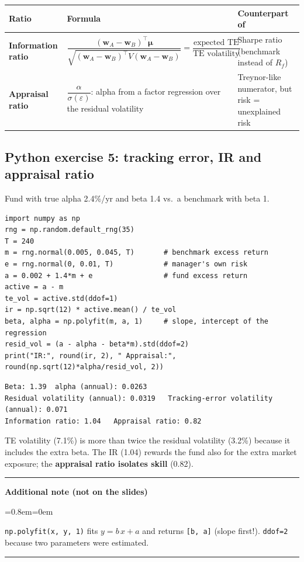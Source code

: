 \documentclass[11pt,a4paper]{report}
\newenvironment{notebox}[1]
  {\par\medskip\Needspace{6\baselineskip}\noindent\rule{\linewidth}{0.4pt}\par\nopagebreak
   \noindent\textbf{#1}\par\nopagebreak
   \begin{list}{}{\leftmargin=0.8em\rightmargin=0em\topsep=2pt}\item[]}
  {\end{list}\nopagebreak\noindent\rule{\linewidth}{0.4pt}\par\medskip}
\newenvironment{addnote}{\begin{notebox}{Additional note (not on the slides)}}{\end{notebox}}
\newcommand{\w}{\bm{w}}
\newcommand{\T}{^{\top}}
\newcommand{\mub}{\bm{\mu}}
\begin{document}
\begin{center}
\begin{tabularx}{\textwidth}{@{}lXX@{}}
\toprule
Ratio & Formula & Counterpart of \\
\midrule
\textbf{Information ratio} & $\dfrac{(\w_A-\w_B)\T\mub}{\sqrt{(\w_A-\w_B)\T V(\w_A-\w_B)}}=\dfrac{\text{expected TE}}{\text{TE volatility}}$ & Sharpe ratio (benchmark instead of $R_f$) \\
\textbf{Appraisal ratio} & $\dfrac{\alpha}{\sigma(\varepsilon)}$: alpha from a factor regression over the residual volatility & Treynor-like numerator, but risk = unexplained risk \\
\bottomrule
\end{tabularx}
\end{center}

\subsection*{Python exercise 5: tracking error, IR and appraisal ratio}
Fund with true alpha 2.4\%/yr and beta 1.4 vs.\ a benchmark with beta 1.
\begin{lstlisting}
import numpy as np
rng = np.random.default_rng(35)
T = 240
m = rng.normal(0.005, 0.045, T)       # benchmark excess return
e = rng.normal(0, 0.01, T)            # manager's own risk
a = 0.002 + 1.4*m + e                 # fund excess return
active = a - m
te_vol = active.std(ddof=1)
ir = np.sqrt(12) * active.mean() / te_vol
beta, alpha = np.polyfit(m, a, 1)     # slope, intercept of the regression
resid_vol = (a - alpha - beta*m).std(ddof=2)
print("IR:", round(ir, 2), " Appraisal:", round(np.sqrt(12)*alpha/resid_vol, 2))
\end{lstlisting}
\begin{lstlisting}[style=out]
Beta: 1.39  alpha (annual): 0.0263
Residual volatility (annual): 0.0319   Tracking-error volatility (annual): 0.071
Information ratio: 1.04   Appraisal ratio: 0.82
\end{lstlisting}
TE volatility (7.1\%) is more than twice the residual volatility (3.2\%) because
it includes the extra beta. The IR (1.04) rewards the fund also for the extra
market exposure; the \textbf{appraisal ratio isolates skill} (0.82).
\begin{addnote}
\texttt{np.polyfit(x, y, 1)} fits $y=b\,x+a$ and returns \texttt{[b, a]}
(slope first!). \texttt{ddof=2} because two parameters were estimated.
\end{addnote}
\end{document}

